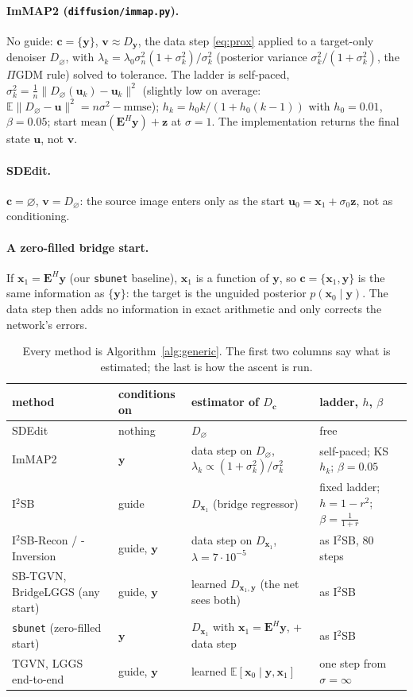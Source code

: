 \documentclass[11pt]{article}
\theoremstyle{remark}
\newcommand{\x}{\bm{x}}
\newcommand{\y}{\bm{y}}
\newcommand{\uu}{\bm{u}}
\newcommand{\vv}{\bm{v}}
\newcommand{\zz}{\bm{z}}
\newcommand{\cc}{\bm{c}}
\newcommand{\E}{\mathbb{E}}
\newcommand{\Op}{\bm{E}}
\newcommand{\code}[1]{\texttt{#1}}
\newcommand{\Dz}{D_{\varnothing}}
\newcommand{\Dg}{D_{\x_1}}
\newcommand{\Dy}{D_{\y}}
\newcommand{\Dgy}{D_{\x_1,\y}}
\begin{document}
\paragraph{ImMAP2 (\code{diffusion/immap.py}).} No guide: $\cc = \{\y\}$, $\vv\approx\Dy$, the
data step \eqref{eq:prox} applied to a target-only denoiser $\Dz$, with
$\lambda_k = \lambda_0\sigma_n^2(1+\sigma_k^2)/\sigma_k^2$ (posterior variance
$\sigma_k^2/(1+\sigma_k^2)$, the $\Pi$GDM rule) solved to tolerance. The ladder is self-paced,
$\sigma_k^2 = \tfrac1n\|\Dz(\uu_k)-\uu_k\|^2$ (slightly low on average:
$\E\|\Dz-\uu\|^2 = n\sigma^2 - \mathrm{mmse}$); $h_k = h_0k/(1+h_0(k-1))$ with $h_0 = 0.01$,
$\beta = 0.05$; start $\mathrm{mean}(\Op^H\y) + \zz$ at $\sigma = 1$. The implementation
returns the final state $\uu$, not $\vv$.

\paragraph{SDEdit.} $\cc = \varnothing$, $\vv = \Dz$: the source image enters only as the start
$\uu_0 = \x_1 + \sigma_0\zz$, not as conditioning.

\paragraph{A zero-filled bridge start.} If $\x_1 = \Op^H\y$ (our \code{sbunet} baseline), $\x_1$
is a function of $\y$, so $\cc = \{\x_1,\y\}$ is the same information as $\{\y\}$: the target is
the unguided posterior $p(\x_0\mid\y)$. The data step then adds no information in exact
arithmetic and only corrects the network's errors.

\begin{table}[H]
\centering
\footnotesize
\begin{tabular}{@{}p{3.6cm}p{2.0cm}p{4.3cm}p{4.6cm}@{}}
\toprule
method & conditions on & estimator of $D_{\cc}$ & ladder, $h$, $\beta$ \\
\midrule
SDEdit & nothing & $\Dz$ & free \\
ImMAP2 & $\y$ & data step on $\Dz$, $\lambda_k\propto(1+\sigma_k^2)/\sigma_k^2$ &
  self-paced; KS $h_k$; $\beta = 0.05$ \\
I$^2$SB & guide & $\Dg$ (bridge regressor) & fixed ladder; $h = 1-r^2$; $\beta = \frac1{1+r}$ \\
I$^2$SB-Recon / -Inversion & guide, $\y$ & data step on $\Dg$, $\lambda = 7\cdot10^{-5}$ &
  as I$^2$SB, 80 steps \\
SB-TGVN, BridgeLGGS (any start) & guide, $\y$ & learned $\Dgy$ (the net sees both) &
  as I$^2$SB \\
\code{sbunet} (zero-filled start) & $\y$ & $\Dg$ with $\x_1 = \Op^H\y$, + data step & as I$^2$SB \\
TGVN, LGGS end-to-end & guide, $\y$ & learned $\E[\x_0\mid\y,\x_1]$ & one step from
  $\sigma = \infty$ \\
\bottomrule
\end{tabular}
\caption{Every method is Algorithm~\ref{alg:generic}. The first two columns say what is
estimated; the last is how the ascent is run.}
\label{tab:methods}
\end{table}
\end{document}
